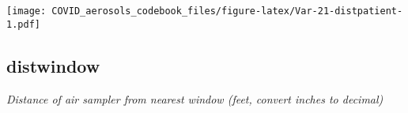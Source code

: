 \documentclass[]{article}
\begin{document}
\begin{minipage}{0.25 \textwidth}

\texttt{[image: COVID\_aerosols\_codebook\_files/figure-latex/Var-21-distpatient-1.pdf]}

\end{minipage}

\noindent\makebox[\linewidth]{\rule{\textwidth}{0.4pt}}

\hypertarget{distwindow}{%
\subsection{distwindow}\label{distwindow}}

\emph{Distance of air sampler from nearest window (feet, convert inches
to decimal)}

\begin{minipage}{0.75 \textwidth}


\end{minipage}
\end{document}
